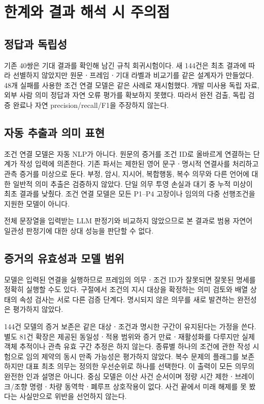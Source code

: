 \section{한계와 결과 해석 시 주의점}
\label{sec:threats}

\begin{revision}

\subsection{정답과 독립성}
기존 40쌍은 기대 결과를 확인해 남긴 규칙 회귀시험이다. 새 144건은 최초 결과에 따라 선별하지 않았지만 원문ㆍ프레임ㆍ기대 라벨과 비교기를 같은 설계자가 만들었다. 48개 실패를 사용한 조건 연결 모델은 같은 사례로 재시험했다. 개발 미사용 독립 자료, 외부 사람 의미 정답과 자연 오류 평가를 확보하지 못했다. 따라서 완전 검출, 독립 검증 완료나 자연 precision/recall/F1을 주장하지 않는다.

\subsection{자동 추출과 의미 표현}
조건 연결 모델은 자동 NLP가 아니다. 원문의 증거를 조건 ID로 올바르게 연결하는 단계가 작성 입력에 의존한다. 기존 파서는 제한된 영어 문구ㆍ명시적 연결사를 처리하고 관측 증거를 미상으로 둔다. 부정, 암시, 지시어, 복합행동, 복수 의무와 다른 언어에 대한 일반적 의미 추출은 검증하지 않았다. 단일 의무 투영 손실과 대기 중 누적 미상이 최초 결과를 낮췄다. 조건 연결 모델은 모든 P1--P4 고장이나 임의의 다중 선행조건을 지원한 모델이 아니다.

전체 문장열을 입력받는 LLM 판정기와 비교하지 않았으므로 본 결과로 범용 자연어 일관성 판정기에 대한 상대 성능을 판단할 수 없다.

\subsection{증거의 유효성과 모델 범위}
모델은 입력된 연결을 실행하므로 프레임의 의무ㆍ조건 ID가 잘못되면 잘못된 명세를 정확히 실행할 수도 있다. 구절에서 조건의 지시 대상을 확정하는 의미 검토와 배열 상태의 속성 검사는 서로 다른 검증 단계다. 명시되지 않은 의무를 새로 발견하는 완전성은 평가하지 않았다.

144건 모델의 증거 보존은 같은 대상ㆍ조건과 명시한 구간이 유지된다는 가정을 쓴다. 별도 81건 확장은 제공된 동일성ㆍ적용 범위와 증거 만료ㆍ재활성화를 다루지만 실제 객체 추적이나 관측 유효 구간 추정은 하지 않는다. 종류별 하나의 조건에 관한 작성 시험으로 임의 제약의 동시 만족 가능성은 평가하지 않았다. 복수 문제의 플래그를 보존하지만 대표 최초 의무는 정의한 우선순위로 하나를 선택한다. 이 출력이 모든 의무의 완전한 인과 설명은 아니다. 중심 모델은 이산 사건 순서이며 정량 시간 제한ㆍ브레이크/조향 명령ㆍ차량 동역학ㆍ폐루프 상호작용이 없다. 사건 끝에서 미래 해제를 못 봤다는 사실만으로 위반을 선언하지 않는다.


\end{revision}
